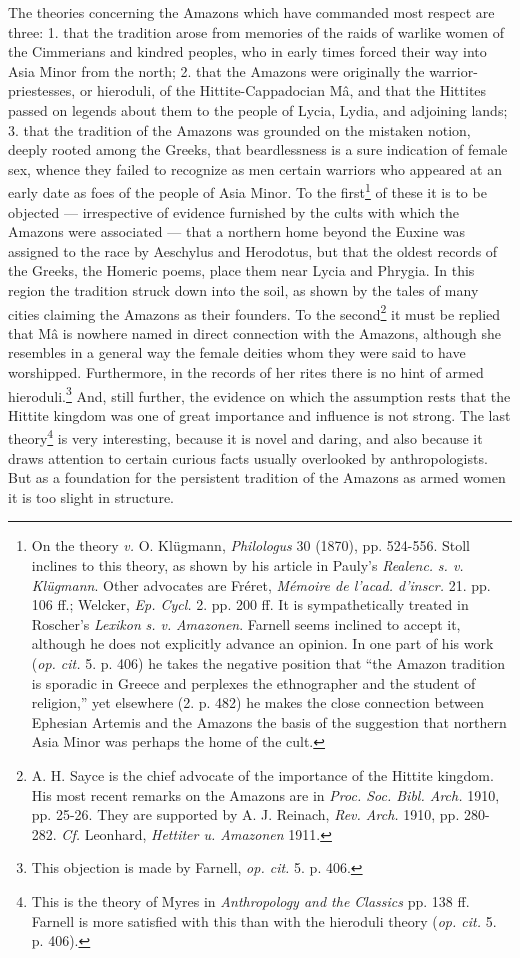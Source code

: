 \documentclass[a4paper, 12pt, oneside]{article}
\begin{document}
The theories concerning the Amazons which have commanded most respect are three: 1. that the tradition arose from memories of the raids of warlike women of the Cimmerians and kindred peoples, who in early times forced their way into Asia Minor from the north; 2. that the Amazons were originally the warrior-priestesses, or hieroduli, of the Hittite-Cappadocian Mâ, and that the Hittites passed on legends about them to the people of Lycia, Lydia, and adjoining lands; 3. that the tradition of the Amazons was grounded on the mistaken notion, deeply rooted among the Greeks, that beardlessness is a sure indication of female sex, whence they failed to recognize as men certain warriors who appeared at an early date as foes of the people of Asia Minor. To the first\footnote{On the theory \emph{v.} O. Klügmann, \emph{Philologus} 30 (1870), pp. 524-556. Stoll inclines to this theory, as shown by his article in Pauly's \emph{Realenc.} \emph{s. v.} \emph{Klügmann}. Other advocates are Fréret, \emph{Mémoire de l'acad. d'inscr.} 21. pp. 106 ff.; Welcker, \emph{Ep. Cycl.} 2. pp. 200 ff. It is sympathetically treated in Roscher's \emph{Lexikon} \emph{s. v.} \emph{Amazonen}. Farnell seems inclined to accept it, although he does not explicitly advance an opinion. In one part of his work (\emph{op. cit.} 5. p. 406) he takes the negative position that ``the Amazon tradition is sporadic in Greece and perplexes the ethnographer and the student of religion,'' yet elsewhere (2. p. 482) he makes the close connection between Ephesian Artemis and the Amazons the basis of the suggestion that northern Asia Minor was perhaps the home of the cult.} of these it is to be objected --- irrespective of evidence furnished by the cults with which the Amazons were associated --- that a northern home beyond the Euxine was assigned to the race by Aeschylus and Herodotus, but that the oldest records of the Greeks, the Homeric poems, place them near Lycia and Phrygia. In this region the tradition struck down into the soil, as shown by the tales of many cities claiming the Amazons as their founders. To the second\footnote{A. H. Sayce is the chief advocate of the importance of the Hittite kingdom. His most recent remarks on the Amazons are in \emph{Proc. Soc. Bibl. Arch.} 1910, pp. 25-26. They are supported by A. J. Reinach, \emph{Rev. Arch.} 1910, pp. 280-282. \emph{Cf.} Leonhard, \emph{Hettiter u. Amazonen} 1911.} it must be replied that Mâ is nowhere named in direct connection with the Amazons, although she resembles in a general way the female deities whom they were said to have worshipped. Furthermore, in the records of her rites there is no hint of armed hieroduli.\footnote{This objection is made by Farnell, \emph{op. cit.} 5. p. 406.} And, still further, the evidence on which the assumption rests that the Hittite kingdom was one of great importance and influence is not strong. The last theory\footnote{This is the theory of Myres in \emph{Anthropology and the Classics} pp. 138 ff. Farnell is more satisfied with this than with the hieroduli theory (\emph{op. cit.} 5. p. 406).} is very interesting, because it is novel and daring, and also because it draws attention to certain curious facts usually overlooked by anthropologists. But as a foundation for the persistent tradition of the Amazons as armed women it is too slight in structure.
\end{document}
